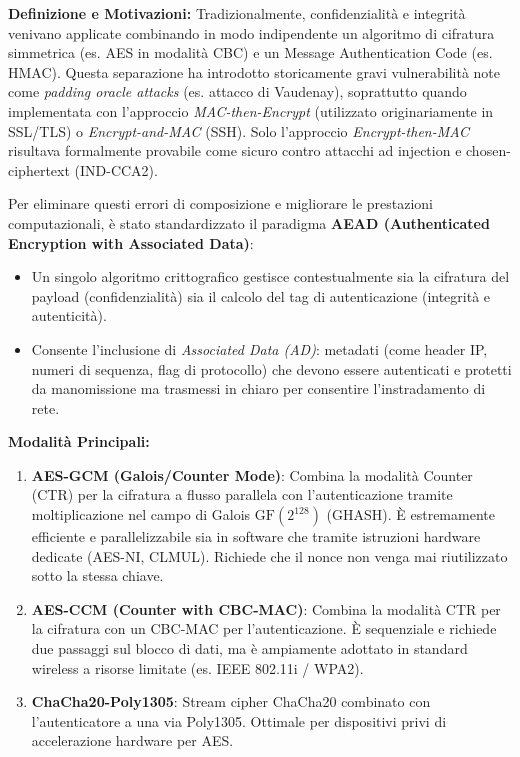 \documentclass[11pt,a4paper]{article}
\begin{document}
\begin{solutionbox}
\textbf{Definizione e Motivazioni:}
Tradizionalmente, confidenzialit\`a e integrit\`a venivano applicate combinando in modo indipendente un algoritmo di cifratura simmetrica (es. AES in modalit\`a CBC) e un Message Authentication Code (es. HMAC). Questa separazione ha introdotto storicamente gravi vulnerabilit\`a note come \textit{padding oracle attacks} (es. attacco di Vaudenay), soprattutto quando implementata con l'approccio \textit{MAC-then-Encrypt} (utilizzato originariamente in SSL/TLS) o \textit{Encrypt-and-MAC} (SSH). Solo l'approccio \textit{Encrypt-then-MAC} risultava formalmente provabile come sicuro contro attacchi ad injection e chosen-ciphertext (IND-CCA2).

Per eliminare questi errori di composizione e migliorare le prestazioni computazionali, \`e stato standardizzato il paradigma \textbf{AEAD (Authenticated Encryption with Associated Data)}:
\begin{itemize}
    \item Un singolo algoritmo crittografico gestisce contestualmente sia la cifratura del payload (confidenzialit\`a) sia il calcolo del tag di autenticazione (integrit\`a e autenticit\`a).
    \item Consente l'inclusione di \textit{Associated Data (AD)}: metadati (come header IP, numeri di sequenza, flag di protocollo) che devono essere autenticati e protetti da manomissione ma trasmessi in chiaro per consentire l'instradamento di rete.
\end{itemize}

\textbf{Modalit\`a Principali:}
\begin{enumerate}
    \item \textbf{AES-GCM (Galois/Counter Mode)}: Combina la modalit\`a Counter (CTR) per la cifratura a flusso parallela con l'autenticazione tramite moltiplicazione nel campo di Galois $\text{GF}(2^{128})$ (GHASH). \`E estremamente efficiente e parallelizzabile sia in software che tramite istruzioni hardware dedicate (AES-NI, CLMUL). Richiede che il nonce non venga mai riutilizzato sotto la stessa chiave.
    \item \textbf{AES-CCM (Counter with CBC-MAC)}: Combina la modalit\`a CTR per la cifratura con un CBC-MAC per l'autenticazione. \`E sequenziale e richiede due passaggi sul blocco di dati, ma \`e ampiamente adottato in standard wireless a risorse limitate (es. IEEE 802.11i / WPA2).
    \item \textbf{ChaCha20-Poly1305}: Stream cipher ChaCha20 combinato con l'autenticatore a una via Poly1305. Ottimale per dispositivi privi di accelerazione hardware per AES.
\end{enumerate}
\end{solutionbox}
\end{document}
